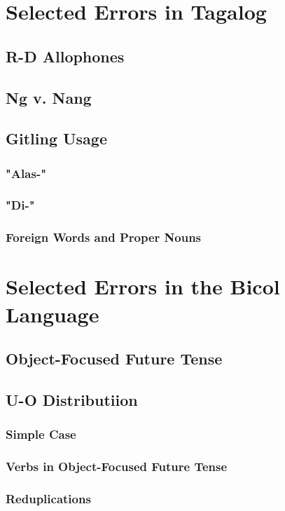 \section{Selected Errors in Tagalog}
\subsection{R-D Allophones}
\subsection{Ng v. Nang}
\subsection{Gitling Usage}
\subsubsection{"Alas-"}
\subsubsection{"Di-"}
\subsubsection{Foreign Words and Proper Nouns}

\section{Selected Errors in the Bicol Language}
\subsection{Object-Focused Future Tense}



\subsection{U-O Distributiion}
\subsubsection{Simple Case}
\subsubsection{Verbs in Object-Focused Future Tense}
\subsubsection{Reduplications}

